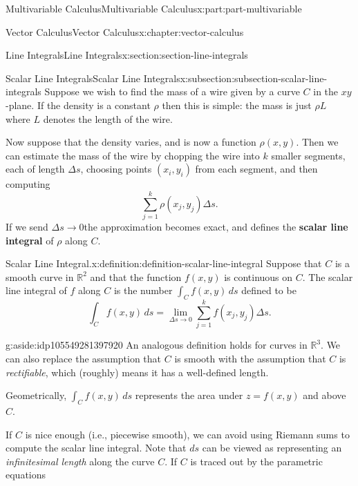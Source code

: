\documentclass[twoside,10pt,]{book}
\newcommand{\terminology}[1]{\textbf{#1}}
\numberwithin{equation}{part}
\newcommand{\RR}{\mathbb{R}}
\begin{document}
\begin{partptx}{Multivariable Calculus}{}{Multivariable Calculus}{}{}{x:part:part-multivariable}
\begin{chapterptx}{Vector Calculus}{}{Vector Calculus}{}{}{x:chapter:vector-calculus}
\begin{sectionptx}{Line Integrals}{}{Line Integrals}{}{}{x:section:section-line-integrals}
\typeout{************************************************}
\typeout{************************************************}
%
\begin{subsectionptx}{Scalar Line Integrals}{}{Scalar Line Integrals}{}{}{x:subsection:subsection-scalar-line-integrals}
Suppose we wish to find the mass of a wire given by a curve \(C\) in the \(xy\)-plane. If the density is a constant \(\rho\) then this is simple: the mass is just \(\rho L\) where \(L\) denotes the length of the wire.%
\par
Now suppose that the density varies, and is now a function \(\rho(x,y)\). Then we can estimate the mass of the wire by chopping the wire into \(k\) smaller segments, each of length \(\Delta s\), choosing points \((x_{i},y_{i})\) from each segment, and then computing%
\begin{equation*}
\sum_{j=1}^{k}\rho(x_{j}, y_{j})\Delta s\text{.}
\end{equation*}
If we send \(\Delta s\to 0\)the approximation becomes exact, and defines the \terminology{scalar line integral} of \(\rho\) along \(C\).%
\begin{definition}{Scalar Line Integral.}{x:definition:definition-scalar-line-integral}%
%
Suppose that \(C\) is a smooth curve in \(\RR^{2}\) and that the function \(f(x,y)\) is continuous on \(C\). The scalar line integral of \(f\) along \(C\) is the number \(\int_{C}f(x,y)\,ds\) defined to be%
\begin{equation*}
\int_{C}f(x,y)\,ds = \lim_{\Delta s\to 0}\sum_{j=1}^{k}f(x_{j},y_{j})\Delta s\text{.}
\end{equation*}
%
\begin{aside}{}{g:aside:idp105549281397920}%
An analogous definition holds for curves in \(\RR^{3}\). We can also replace the assumption that \(C\) is smooth with the assumption that \(C\) is \emph{rectifiable}, which (roughly) means it has a well-defined length.%
\end{aside}
\end{definition}
Geometrically, \(\int_{C}f(x,y)\,ds\) represents the area under \(z = f(x,y)\) and above \(C\).%
\par
If \(C\) is nice enough (i.e., piecewise smooth), we can avoid using Riemann sums to compute the scalar line integral. Note that \(ds\) can be viewed as representing an \emph{infinitesimal length} along the curve \(C\). If \(C\) is traced out by the parametric equations%
\begin{align*}

\end{align*}
\end{subsectionptx}
\end{sectionptx}
\end{chapterptx}
\end{partptx}
\end{document}
